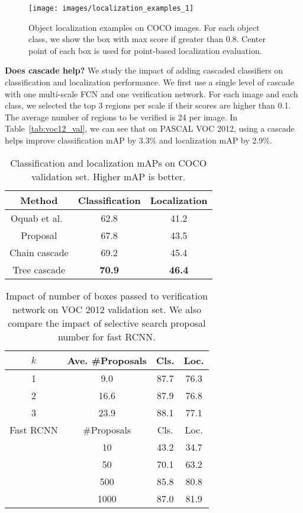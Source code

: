 \documentclass[10pt,twocolumn,letterpaper]{article}
\begin{document}
\begin{figure*}[t]
  \centering
    \texttt{[image: images/localization\_examples\_1]}
  \caption{Object localization examples on COCO images. For each object class, we show the box with max score if greater than 0.8. Center point of each box is used for point-based localization evaluation.}
  \label{fig:loc_vis}
\end{figure*}

\textbf{Does cascade help?} We study the impact of adding cascaded classifiers on classification and localization performance. We first use a single level of cascade with one multi-scale FCN and one verification network. For each image and each class, we selected the top 3 regions per scale if their scores are higher than 0.1. The average number of regions to be verified is 24 per image. In Table~\ref{tab:voc12_val}, we can see that on PASCAL VOC 2012, using a cascade helps improve classification mAP by 3.3\% and localization mAP by 2.9\%.



\begin{table}
\small
\center
\begin{tabular}{ccc}
\hline
Method & Classification & Localization\\
\hline
Oquab et al.~\cite{Oquab_2015_CVPR} & 62.8 & 41.2\\
\rowcolor{gray!30}Proposal & 67.8 & 43.5\\
Chain cascade & 69.2 & 45.4\\
\rowcolor{gray!30}Tree cascade & \textbf{70.9} & \textbf{46.4}\\
\hline
\end{tabular}
\caption{Classification and localization mAPs on COCO validation set. Higher mAP is better.}
\label{tab:coco_result}
\end{table}


\begin{table}
\small
\center
\begin{tabular}{cccc}
\hline
$k$ & Ave. \#Proposals & Cls. & Loc.\\
\hline
\rowcolor{gray!30}1 & 9.0 & 87.7 & 76.3\\
2 & 16.6 & 87.9 & 76.8\\
\rowcolor{gray!30}3 & 23.9 & 88.1 & 77.1\\
\hline
\hline
Fast RCNN & \#Proposals & Cls. & Loc.\\
\hline
\rowcolor{gray!30}&10&43.2&34.7\\
&50&70.1&63.2\\
\rowcolor{gray!30}&500&85.8&80.8\\
&1000&87.0&81.9\\
\hline
\end{tabular}
\caption{Impact of number of boxes passed to verification network on VOC 2012 validation set. We also compare the impact of selective search proposal number for fast RCNN.}
\label{tab:proposal_number}
\end{table}
\end{document}
